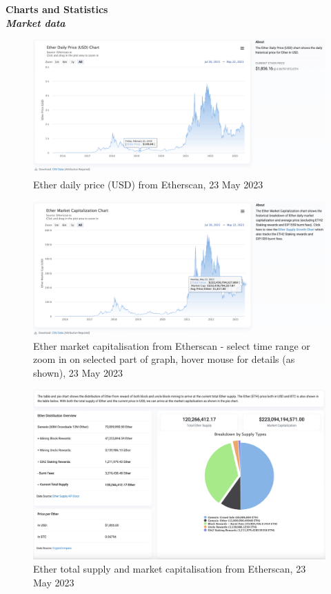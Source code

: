 \documentclass[UTF8]{article}
\begin{document}
\clearpage
\textbf{Charts and Statistics}\\
\textit{\textbf{Market data}}
\begin{figure}[htbp]
\begin{center}
\includegraphics[width=0.9\linewidth]{images/ethdaily}
\caption{Ether daily price (USD) from Etherscan, 23 May 2023}
\label{fig:ethdaily}
\end{center}
\end{figure}

\begin{figure}[htbp]
\begin{center}
\includegraphics[width=0.9\linewidth]{images/marketcap}
\caption{Ether market capitalisation from Etherscan  - select time range or zoom in on selected part of graph, hover mouse for details (as shown), 23 May 2023}
\label{fig:marketcap}
\end{center}
\end{figure}

\begin{figure}[htbp]
\begin{center}
\includegraphics[width=0.9\linewidth]{images/totcap}
\caption{Ether total supply and market capitalisation from Etherscan, 23 May 2023}
\label{fig:totcap}
\end{center}
\end{figure}
\end{document}
